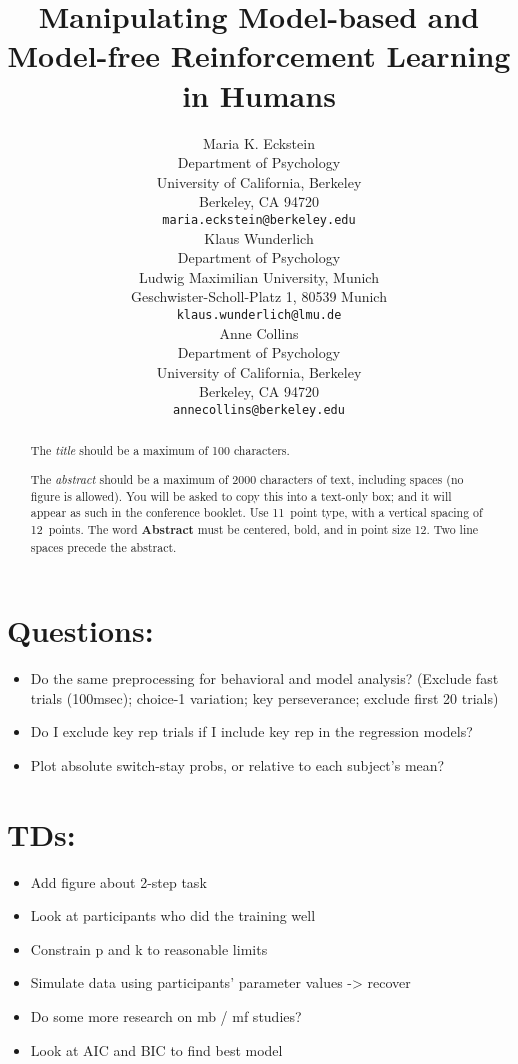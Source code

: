 \documentclass[11pt]{article} %
\title{Manipulating Model-based and Model-free Reinforcement Learning in Humans}
\author{
Maria K. Eckstein \\
Department of Psychology \\
University of California, Berkeley \\
Berkeley, CA 94720 \\
\texttt{maria.eckstein@berkeley.edu} \\
\And
Klaus Wunderlich \\
Department of Psychology \\
Ludwig Maximilian University, Munich \\
Geschwister-Scholl-Platz 1, 80539 Munich \\
\texttt{klaus.wunderlich@lmu.de} \\
\And
Anne Collins \\
Department of Psychology\\
University of California, Berkeley \\
Berkeley, CA 94720  \\
\texttt{annecollins@berkeley.edu} \\
}
\begin{document}
\maketitle

\begin{abstract}
The \emph{title} should be a maximum of 100 characters. 

The \emph{abstract} should be a maximum of 2000 characters of text,
including spaces (no figure is allowed). You will be asked to copy
this into a text-only box; and it will appear as such in the
conference booklet. Use 11~point type, with a vertical spacing of
12~points.  The word \textbf{Abstract} must be centered, bold, and in
point size 12. Two line spaces precede the abstract.
\end{abstract}




\startmain %

\section{Questions:}
\begin{itemize}
	\item Do the same preprocessing for behavioral and model analysis? (Exclude fast trials (100msec); choice-1 variation; key perseverance; exclude first 20 trials)
	\item Do I exclude key rep trials if I include key rep in the regression models?
	\item Plot absolute switch-stay probs, or relative to each subject's mean?
\end{itemize}

\section{TDs:}
\begin{itemize}
	\item Add figure about 2-step task
	\item Look at participants who did the training well
	\item Constrain p and k to reasonable limits
	\item Simulate data using participants' parameter values -> recover
	\item Do some more research on mb / mf studies?
	\item Look at AIC and BIC to find best model
\end{itemize}
\end{document}

